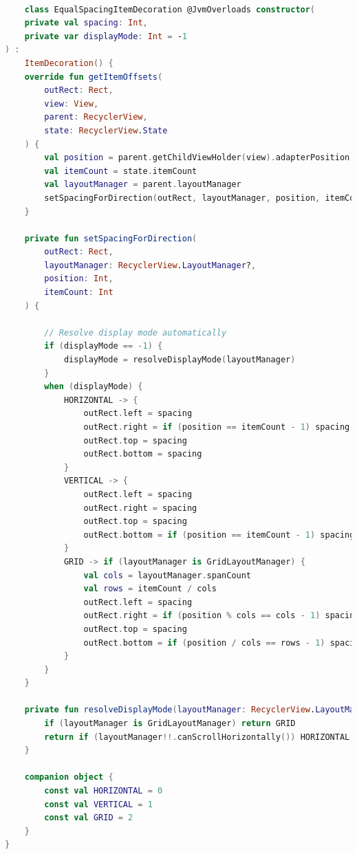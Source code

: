 \documentclass[a4paper, 12pt]{article}
\begin{document}
\begin{lstlisting}[caption={EqualSpacingItemDecoration class.}, label={code:equalSpacingItemDecoration_class}, language=Kotlin]

    class EqualSpacingItemDecoration @JvmOverloads constructor(
    private val spacing: Int,
    private var displayMode: Int = -1
) :
    ItemDecoration() {
    override fun getItemOffsets(
        outRect: Rect,
        view: View,
        parent: RecyclerView,
        state: RecyclerView.State
    ) {
        val position = parent.getChildViewHolder(view).adapterPosition
        val itemCount = state.itemCount
        val layoutManager = parent.layoutManager
        setSpacingForDirection(outRect, layoutManager, position, itemCount)
    }

    private fun setSpacingForDirection(
        outRect: Rect,
        layoutManager: RecyclerView.LayoutManager?,
        position: Int,
        itemCount: Int
    ) {

        // Resolve display mode automatically
        if (displayMode == -1) {
            displayMode = resolveDisplayMode(layoutManager)
        }
        when (displayMode) {
            HORIZONTAL -> {
                outRect.left = spacing
                outRect.right = if (position == itemCount - 1) spacing else 0
                outRect.top = spacing
                outRect.bottom = spacing
            }
            VERTICAL -> {
                outRect.left = spacing
                outRect.right = spacing
                outRect.top = spacing
                outRect.bottom = if (position == itemCount - 1) spacing else 0
            }
            GRID -> if (layoutManager is GridLayoutManager) {
                val cols = layoutManager.spanCount
                val rows = itemCount / cols
                outRect.left = spacing
                outRect.right = if (position % cols == cols - 1) spacing else 0
                outRect.top = spacing
                outRect.bottom = if (position / cols == rows - 1) spacing else 0
            }
        }
    }

    private fun resolveDisplayMode(layoutManager: RecyclerView.LayoutManager?): Int {
        if (layoutManager is GridLayoutManager) return GRID
        return if (layoutManager!!.canScrollHorizontally()) HORIZONTAL else VERTICAL
    }

    companion object {
        const val HORIZONTAL = 0
        const val VERTICAL = 1
        const val GRID = 2
    }
}

\end{lstlisting} 
\end{document}
